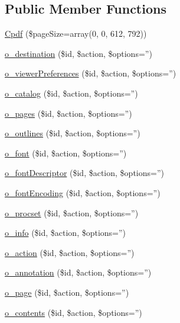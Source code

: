 \subsection*{\-Public \-Member \-Functions}
\begin{DoxyCompactItemize}
\item 
\hyperlink{class_cpdf_a9cc0b020830361e9584150763b9995ae}{\-Cpdf} (\$page\-Size=array(0, 0, 612, 792))
\item 
\hyperlink{class_cpdf_a2432dc753eab2f8786f3b6c97cfdca59}{o\-\_\-destination} (\$id, \$action, \$options='')
\item 
\hyperlink{class_cpdf_a37a4d12fd4fe6536921eabccfc55bae3}{o\-\_\-viewer\-Preferences} (\$id, \$action, \$options='')
\item 
\hyperlink{class_cpdf_ad5269fc1648ba039f9ab1d372b89aa55}{o\-\_\-catalog} (\$id, \$action, \$options='')
\item 
\hyperlink{class_cpdf_a81c56aa681c1462c1a2d29a4b164e1c9}{o\-\_\-pages} (\$id, \$action, \$options='')
\item 
\hyperlink{class_cpdf_a5e6a4d8146f8dc8424c01107deae2363}{o\-\_\-outlines} (\$id, \$action, \$options='')
\item 
\hyperlink{class_cpdf_a607aaa24e2d8b46f8c387d0d5144cd9a}{o\-\_\-font} (\$id, \$action, \$options='')
\item 
\hyperlink{class_cpdf_ab2907958d0d7da9764c61510b32a3e76}{o\-\_\-font\-Descriptor} (\$id, \$action, \$options='')
\item 
\hyperlink{class_cpdf_aedda68b5afe6900c14375f2fe4c63bd5}{o\-\_\-font\-Encoding} (\$id, \$action, \$options='')
\item 
\hyperlink{class_cpdf_a8c957eb8366fe5b89727c7ec68700afc}{o\-\_\-procset} (\$id, \$action, \$options='')
\item 
\hyperlink{class_cpdf_a1b15589e09e12f423f87d8ba3b1b1be4}{o\-\_\-info} (\$id, \$action, \$options='')
\item 
\hyperlink{class_cpdf_ab01e4e5dac06bdd7480879a215fe552d}{o\-\_\-action} (\$id, \$action, \$options='')
\item 
\hyperlink{class_cpdf_aef859651290d314f10fbb2aee0a3785b}{o\-\_\-annotation} (\$id, \$action, \$options='')
\item 
\hyperlink{class_cpdf_aa8f8c9faae6d2ef10e350675dde97f8d}{o\-\_\-page} (\$id, \$action, \$options='')
\item 
\hyperlink{class_cpdf_ac8729d6b851615394c82bda391f37adb}{o\-\_\-contents} (\$id, \$action, \$options='')
\item 

\end{DoxyCompactItemize}
